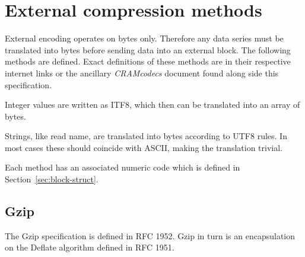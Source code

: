 \documentclass[a4paper]{article}
\begin{document}
% 
% 
% 
% 
% 
% 

\section{\textbf{External compression methods}}

External encoding operates on bytes only. Therefore any data series must be translated into bytes before sending data into an external block.
The following methods are defined.
Exact definitions of these methods are in their respective internet links or the ancillary \textit{CRAMcodecs} document found along side this specification.

Integer values are written as ITF8, which then can be translated into an array 
of bytes. 

Strings, like read name, are translated into bytes according to UTF8 rules. In 
most cases these should coincide with ASCII, making the translation trivial.

Each method has an associated numeric code which is defined in Section~\ref{sec:block-struct}.

\subsection{\textbf{Gzip}}

The Gzip specification is defined in RFC 1952.
Gzip in turn is an encapsulation on the Deflate algorithm defined in RFC 1951.
\end{document}
